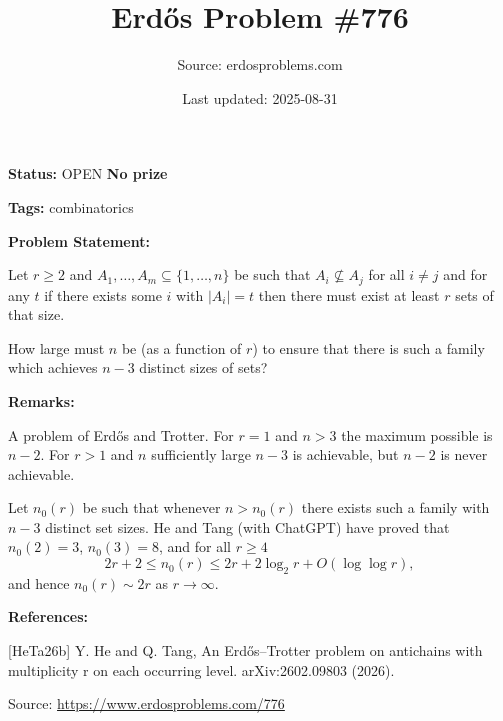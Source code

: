 \documentclass{article}
\title{Erd\H{o}s Problem \#776}
\date{Last updated: 2025-08-31}
\author{Source: erdosproblems.com}
\begin{document}
\maketitle

\noindent\textbf{Status:} OPEN \quad \textbf{No prize}

\noindent\textbf{Tags:} combinatorics

\medskip
\noindent\textbf{Problem Statement:}

Let $r\geq 2$ and $A_1,\ldots,A_m\subseteq \{1,\ldots,n\}$ be such that $A_i\not\subseteq A_j$ for all $i\neq j$ and for any $t$ if there exists some $i$ with $\lvert A_i\rvert=t$ then there must exist at least $r$ sets of that size.

How large must $n$ be (as a function of $r$) to ensure that there is such a family which achieves $n-3$ distinct sizes of sets?

\bigskip
\noindent\textbf{Remarks:}

A problem of Erd\H{o}s and Trotter. For $r=1$ and $n>3$ the maximum possible is $n-2$. For $r>1$ and $n$ sufficiently large $n-3$ is achievable, but $n-2$ is never achievable.

Let $n_0(r)$ be such that whenever $n>n_0(r)$ there exists such a family with $n-3$ distinct set sizes. He and Tang \cite{HeTa26b} (with ChatGPT) have proved that $n_0(2)=3$, $n_0(3)=8$, and for all $r\geq 4$\[2r+2\leq n_0(r)\leq 2r+2\log_2r+O(\log\log r),\]and hence $n_0(r)\sim 2r$ as $r\to \infty$.

\bigskip
\noindent\textbf{References:}

[HeTa26b] Y. He and Q. Tang, An Erd\H{o}s--Trotter problem on antichains with multiplicity r on each occurring level. arXiv:2602.09803 (2026).

\bigskip
\noindent\small{Source: \url{https://www.erdosproblems.com/776}}
\end{document}
